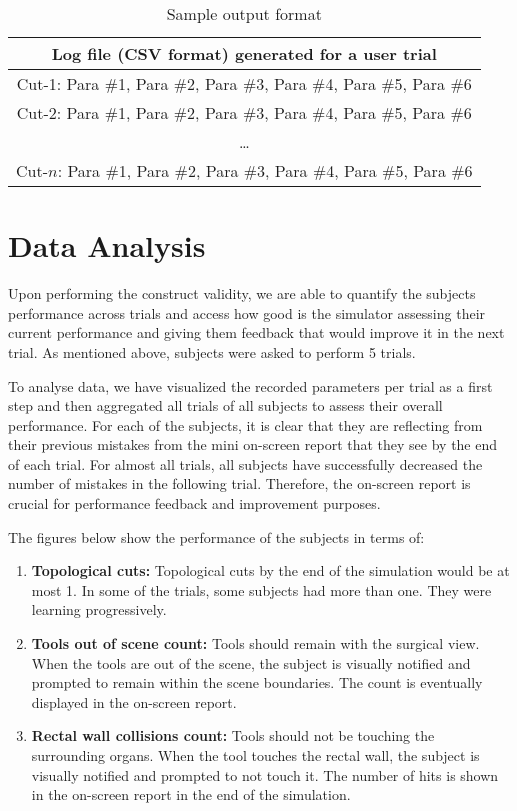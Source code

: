 \begin{table}
\small
\centering
\begin{tabular}{c}
 Log file (CSV format) generated for a user trial\\
 \toprule
 Cut-1: Para \#1, Para \#2, Para \#3, Para \#4, Para \#5, Para \#6 \\
 \midrule
 Cut-2: Para \#1, Para \#2, Para \#3, Para \#4, Para \#5, Para \#6\\
 \midrule
 \ldots\\
 \midrule
 Cut-$n$: Para \#1, Para \#2, Para \#3, Para \#4, Para \#5, Para \#6\\
 \bottomrule
\end{tabular}
\caption{Sample output format}\label{tab:csv}
\end{table}

\section{Data Analysis}
Upon performing the construct validity, we are able to quantify the subjects performance across trials and access how good is the simulator assessing their current performance and giving them feedback that would improve it in the next trial. As mentioned above, subjects were asked to perform 5 trials.

To analyse data, we have visualized the recorded parameters per trial as a first step and then aggregated all trials of all subjects to assess their overall performance. For each of the subjects, it is clear that they are reflecting from their previous mistakes from the mini on-screen report that they see by the end of each trial. For almost all trials, all subjects have successfully decreased the number of mistakes in the following trial. Therefore, the on-screen report is crucial for performance feedback and improvement purposes.

The figures below show the performance of the subjects in terms of:
\begin{enumerate}
    \item \textbf{Topological cuts:} Topological cuts by the end of the simulation would be at most 1. In some of the trials, some subjects had more than one. They were learning progressively.
    \item \textbf{Tools out of scene count:} Tools should remain with the surgical view. When the tools are out of the scene, the subject is visually notified and prompted to remain within the scene boundaries. The count is eventually displayed in the on-screen report.
    \item \textbf{Rectal wall collisions count:} Tools should not be touching the surrounding organs. When the tool touches the rectal wall, the subject is visually notified and prompted to not touch it. The number of hits is shown in the on-screen report in the end of the simulation.
\end{enumerate}

